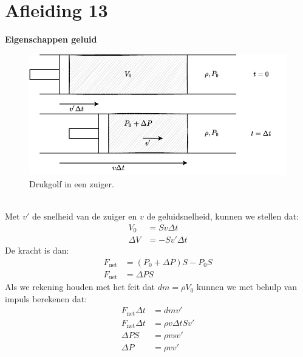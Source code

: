 \documentclass[a4paper,kul]{kulakarticle} %
\begin{document}
\section{Afleiding 13}
\textbf{Eigenschappen geluid}\\
\begin{figure}[h]
	\centering
	\includegraphics[width=0.7\linewidth]{EigenschappenGeluid}
	\caption[Zuiger]{Drukgolf in een zuiger.}
	\label{fig:drukgolfzuiger}
\end{figure}\\
Met $v'$ de snelheid van de zuiger en $v$ de geluidsnelheid, kunnen we stellen dat:
\begin{align*}
	V_0 &=Sv\Delta t\\
	\Delta V &= -Sv'\Delta t
\end{align*}
De kracht is dan:
\begin{align*}
	F_{\text{net}} &= (P_0+\Delta P)S-P_0S\\
	F_{\text{net}}&= \Delta PS
\end{align*}
Als we rekening houden met het feit dat $dm=\rho V_0$ kunnen we met behulp van impuls berekenen dat:
\begin{align*}
	F_{\text{net}} \Delta t &=dmv'\\
	F_{\text{net}}\Delta t &= \rho v\Delta tSv'\\
	\Delta PS &= \rho vsv'\\
	\Delta P &= \rho vv'
\end{align*}
\newpage
\end{document}
